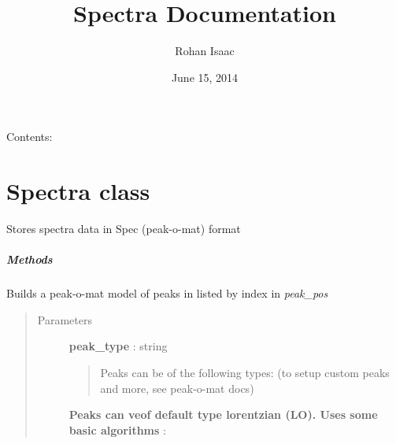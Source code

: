 \documentclass[letterpaper,10pt,english]{sphinxmanual}
\title{Spectra Documentation}
\date{June 15, 2014}
\author{Rohan Isaac}
\begin{document}
\maketitle
\tableofcontents
{}\label{index::doc}


Contents:


\chapter{Spectra class}
\label{spectra:spectra-class}\label{spectra::doc}\label{spectra:welcome-to-spectra-s-documentation}

\begin{fulllineitems}
\label{spectra:spectra.Spectra}
Stores spectra data in Spec (peak-o-mat) format
\paragraph{Methods}

\begin{fulllineitems}
\label{spectra:spectra.Spectra.build_model}
Builds a peak-o-mat model of peaks in listed by index in \emph{peak\_pos}
\begin{quote}\begin{description}
\item[{Parameters}] \leavevmode
\textbf{peak\_type} : string
\begin{quote}

Peaks can be of the following types: 
(to setup custom peaks and more, see peak-o-mat docs)

\end{quote}

\textbf{Peaks can veof default type lorentzian (LO). Uses some basic algorithms} :


\end{description}
\end{quote}
\end{fulllineitems}
\end{fulllineitems}
\end{document}

